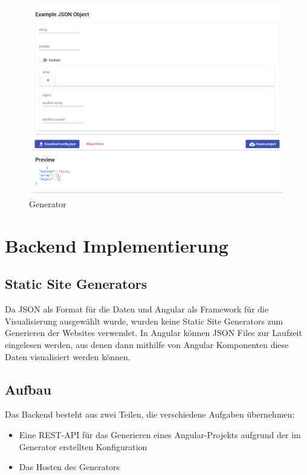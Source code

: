 \begin{figure}[hbt!]
    \centering
    \includegraphics[scale=.5]{pics/generator}
    \caption{Generator}
\end{figure}


\section{Backend Implementierung}

\subsection{Static Site Generators}
Da JSON als Format für die Daten und Angular als Framework für die Visualisierung ausgewählt wurde, wurden
keine Static Site Generators zum Generieren der Websites verwendet.
In Angular können JSON Files zur Laufzeit eingelesen werden, aus denen dann mithilfe von Angular Komponenten diese
Daten visualisiert werden können.

\subsection{Aufbau}
Das Backend besteht aus zwei Teilen, die verschiedene Aufgaben übernehmen:

\begin{itemize}
    \item Eine REST-API für das Generieren eines Angular-Projekts aufgrund der im Generator erstellten Konfiguration
    \item Das Hosten des Generators
\end{itemize}

